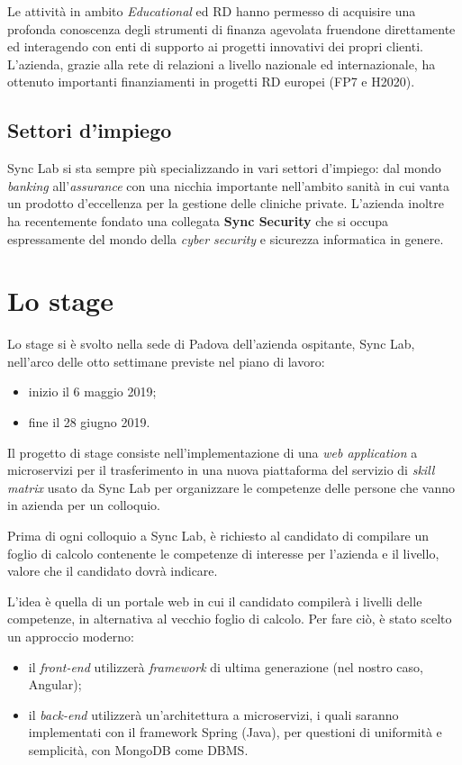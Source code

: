 Le attività in ambito \textit{Educational} ed RD hanno permesso di acquisire una profonda
conoscenza degli strumenti di finanza agevolata fruendone direttamente ed interagendo
con enti di supporto ai progetti innovativi dei propri clienti. L'azienda, grazie alla rete
di relazioni a livello nazionale ed internazionale, ha ottenuto importanti finanziamenti
in progetti RD europei (FP7 e H2020).

\subsection{Settori d'impiego}

Sync Lab si sta sempre più specializzando in vari settori d'impiego: dal mondo \textit{banking}
all'\textit{assurance} con una nicchia importante nell'ambito sanità in cui vanta un prodotto
d'eccellenza per la gestione delle cliniche private.
L'azienda inoltre ha recentemente fondato una collegata \textbf{Sync Security} che si occupa
espressamente del mondo della \textit{cyber security} e sicurezza informatica in genere.


\section{Lo stage}

Lo stage si è svolto nella sede di Padova dell'azienda ospitante, Sync Lab, nell'arco delle otto settimane previste nel piano di lavoro:
\begin{itemize}
	\item inizio il 6 maggio 2019;
	\item fine il 28 giugno 2019.
\end{itemize}
Il progetto di stage consiste nell'implementazione di una \textit{web application} a microservizi per il trasferimento in una nuova piattaforma del servizio di \textit{skill matrix} usato da Sync Lab per organizzare le competenze delle persone che vanno in azienda per un colloquio.

Prima di ogni colloquio a Sync Lab, è richiesto al candidato di compilare un foglio di calcolo contenente le competenze di interesse
per l'azienda e il livello, valore che il candidato dovrà indicare.

L'idea è quella di un portale web in cui il candidato compilerà i livelli delle competenze, in alternativa al vecchio foglio di calcolo.
Per fare ciò, è stato scelto un approccio moderno: 
\begin{itemize}
	\item il \textit{front-end} utilizzerà \textit{framework} di ultima generazione (nel nostro caso, Angular);
	\item il \textit{back-end} utilizzerà un'architettura a microservizi, i quali saranno implementati con il framework Spring (Java), per questioni di uniformità e semplicità, con MongoDB come DBMS.
\end{itemize}

